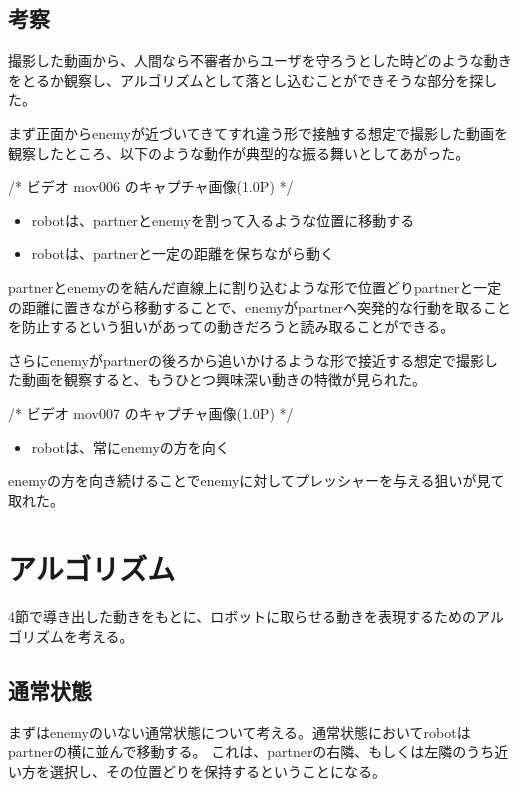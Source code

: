 \documentclass{kuisthesis}
\begin{document}
\subsection{考察}
撮影した動画から、人間なら不審者からユーザを守ろうとした時どのような動きをとるか観察し、アルゴリズムとして落とし込むことができそうな部分を探した。

まず正面からenemyが近づいてきてすれ違う形で接触する想定で撮影した動画を観察したところ、以下のような動作が典型的な振る舞いとしてあがった。

/* ビデオ mov006 のキャプチャ画像(1.0P) */

\begin{itemize}
\item robotは、partnerとenemyを割って入るような位置に移動する
\item robotは、partnerと一定の距離を保ちながら動く
\end{itemize}

partnerとenemyのを結んだ直線上に割り込むような形で位置どりpartnerと一定の距離に置きながら移動することで、enemyがpartnerへ突発的な行動を取ることを防止するという狙いがあっての動きだろうと読み取ることができる。

さらにenemyがpartnerの後ろから追いかけるような形で接近する想定で撮影した動画を観察すると、もうひとつ興味深い動きの特徴が見られた。

/* ビデオ mov007 のキャプチャ画像(1.0P) */

\begin{itemize}
\item robotは、常にenemyの方を向く
\end{itemize}

enemyの方を向き続けることでenemyに対してプレッシャーを与える狙いが見て取れた。






\section{アルゴリズム}

4節で導き出した動きをもとに、ロボットに取らせる動きを表現するためのアルゴリズムを考える。

\subsection{通常状態}
まずはenemyのいない通常状態について考える。通常状態においてrobotはpartnerの横に並んで移動する。
これは、partnerの右隣、もしくは左隣のうち近い方を選択し、その位置どりを保持するということになる。
\end{document}

